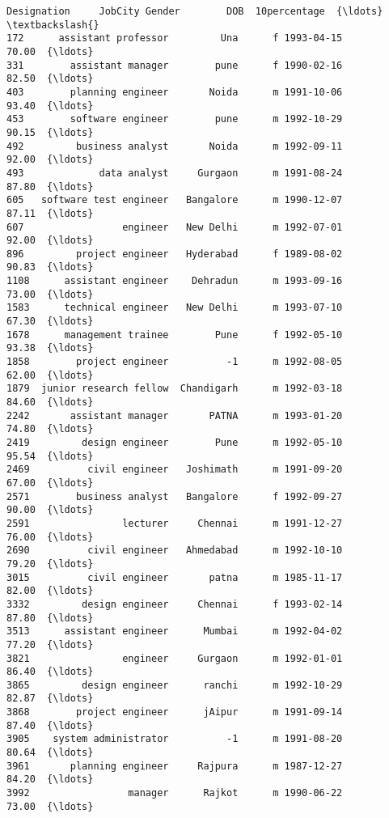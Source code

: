 \documentclass[11pt]{article}
\begin{document}
\begin{tcolorbox}[breakable, size=fbox, boxrule=.5pt, pad at break*=1mm, opacityfill=0]
\begin{Verbatim}[commandchars=\\\{\}]
                 Designation     JobCity Gender        DOB  10percentage  {\ldots}  \textbackslash{}
172      assistant professor         Una      f 1993-04-15         70.00  {\ldots}
331        assistant manager        pune      f 1990-02-16         82.50  {\ldots}
403        planning engineer       Noida      m 1991-10-06         93.40  {\ldots}
453        software engineer        pune      m 1992-10-29         90.15  {\ldots}
492         business analyst       Noida      m 1992-09-11         92.00  {\ldots}
493             data analyst     Gurgaon      m 1991-08-24         87.80  {\ldots}
605   software test engineer   Bangalore      m 1990-12-07         87.11  {\ldots}
607                 engineer   New Delhi      m 1992-07-01         92.00  {\ldots}
896         project engineer   Hyderabad      f 1989-08-02         90.83  {\ldots}
1108      assistant engineer    Dehradun      m 1993-09-16         73.00  {\ldots}
1583      technical engineer   New Delhi      m 1993-07-10         67.30  {\ldots}
1678      management trainee        Pune      f 1992-05-10         93.38  {\ldots}
1858        project engineer          -1      m 1992-08-05         62.00  {\ldots}
1879  junior research fellow  Chandigarh      m 1992-03-18         84.60  {\ldots}
2242       assistant manager       PATNA      m 1993-01-20         74.80  {\ldots}
2419         design engineer        Pune      m 1992-05-10         95.54  {\ldots}
2469          civil engineer   Joshimath      m 1991-09-20         67.00  {\ldots}
2571        business analyst   Bangalore      f 1992-09-27         90.00  {\ldots}
2591                lecturer     Chennai      m 1991-12-27         76.00  {\ldots}
2690          civil engineer   Ahmedabad      m 1992-10-10         79.20  {\ldots}
3015          civil engineer       patna      m 1985-11-17         82.00  {\ldots}
3332         design engineer     Chennai      f 1993-02-14         87.80  {\ldots}
3513      assistant engineer      Mumbai      m 1992-04-02         77.20  {\ldots}
3821                engineer     Gurgaon      m 1992-01-01         86.40  {\ldots}
3865         design engineer      ranchi      m 1992-10-29         82.87  {\ldots}
3868        project engineer      jAipur      m 1991-09-14         87.40  {\ldots}
3905    system administrator          -1      m 1991-08-20         80.64  {\ldots}
3961       planning engineer     Rajpura      m 1987-12-27         84.20  {\ldots}
3992                 manager      Rajkot      m 1990-06-22         73.00  {\ldots}


\end{Verbatim}
\end{tcolorbox}
\end{document}
